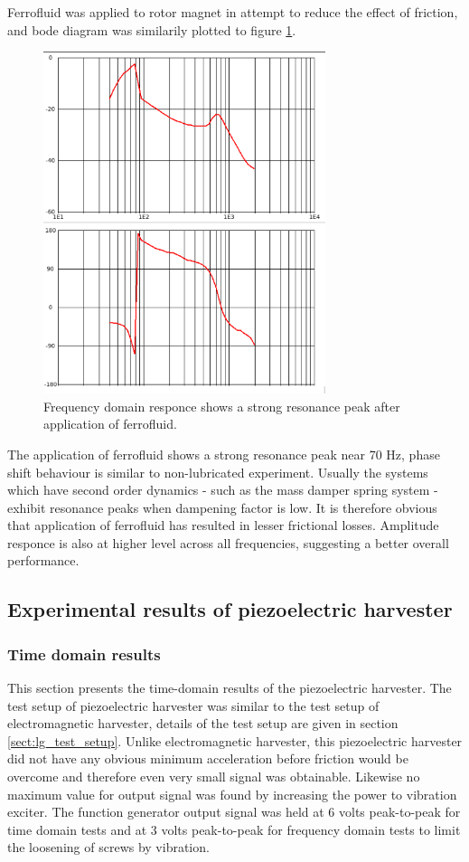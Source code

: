 Ferrofluid was applied to rotor magnet in attempt to reduce the effect of friction, and bode diagram was similarily plotted to figure \ref{fig:inductive_bode_ferro}.

\begin{figure}[htb]
\begin{center}
\includegraphics[height=10cm]{images/own_measurement/generator_shaker/inductive_bode_ferro.png}
\end{center}
\caption{\label{fig:inductive_bode_ferro} Frequency domain responce shows a strong resonance peak after application of ferrofluid.}
\end{figure}

The application of ferrofluid shows a strong resonance peak near 70 Hz, phase shift behaviour is similar to non-lubricated experiment. Usually the systems which have second order dynamics - such as the mass damper spring system - exhibit resonance peaks when dampening factor is low. It is therefore obvious that application of ferrofluid has resulted in lesser frictional losses. Amplitude responce is also at higher level across all frequencies, suggesting a better overall performance. 

\subsection{Experimental results of piezoelectric harvester}

\subsubsection{Time domain results}
This section presents the time-domain results of the piezoelectric harvester. The test setup of piezoelectric harvester was similar to the test setup of electromagnetic harvester, details of the test setup are given in section \ref{sect:lg_test_setup}. Unlike electromagnetic harvester, this piezoelectric harvester did not have any obvious minimum acceleration before friction would be overcome and therefore even very small signal was obtainable. Likewise no maximum value for output signal was found by increasing the power to vibration exciter. The function generator output signal was held at 6 volts peak-to-peak for time domain tests and at 3 volts peak-to-peak for frequency domain tests to limit the loosening of screws by vibration.

